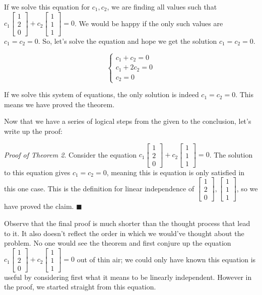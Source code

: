 \documentclass[11pt]{article}
\begin{document}
    If we solve this equation for $c_1,c_2$, we are finding all values such that
    $c_1\begin{bmatrix}1 \\ 2 \\ 0\end{bmatrix}+
    c_2\begin{bmatrix}1 \\ 1 \\ 1\end{bmatrix}=0$. We would be happy if the only such
    values are $c_1=c_2=0$. So, let's solve the equation and hope we get the solution
    $c_1=c_2=0$.
    
    $$\begin{cases}
    c_1+c_2=0 \\
    c_1+2c_2=0 \\
    c_2=0
    \end{cases}$$
    
    If we solve this system of equations, the only solution is indeed $c_1=c_2=0$.
    This means we have proved the theorem.
    
    Now that we have a series of logical steps from the given to the conclusion, let's
    write up the proof:
    
    \textit{Proof of Theorem 2}. Consider the equation
    $c_1\begin{bmatrix}1 \\ 2 \\ 0\end{bmatrix}+
    c_2\begin{bmatrix}1 \\ 1 \\ 1\end{bmatrix}=0$. The solution to this equation gives
    $c_1=c_2=0$, meaning this is equation is only satisfied in this one case. This is
    the definition for linear independence of $\begin{bmatrix}1 \\ 2 \\ 0\end{bmatrix},
    \begin{bmatrix}1 \\ 1 \\ 1\end{bmatrix}$, so we have proved the claim. $\blacksquare$
    
    Observe that the final proof is much shorter than the thought process that lead to it.
    It also doesn't reflect the order in which we would've thought about the problem.
    No one would see the theorem and first conjure up the equation
    $c_1\begin{bmatrix}1 \\ 2 \\ 0\end{bmatrix}+
    c_2\begin{bmatrix}1 \\ 1 \\ 1\end{bmatrix}=0$ out of thin air; we could only
    have known this equation is useful by considering first what it means to be linearly
    independent. However in the proof, we started straight from this equation.
    
\end{document}

